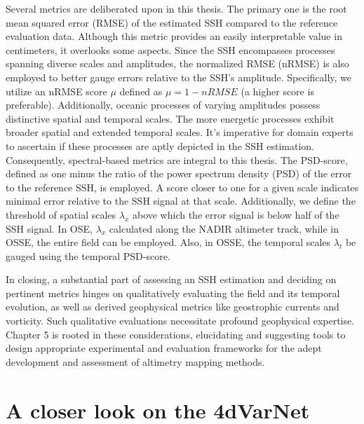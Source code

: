 \begin{bibunit}
Several metrics are deliberated upon in this thesis. The primary one is the root mean squared error (RMSE) of the estimated SSH compared to the reference evaluation data. Although this metric provides an easily interpretable value in centimeters, it overlooks some aspects. Since the SSH encompasses processes spanning diverse scales and amplitudes, the normalized RMSE (nRMSE) is also employed to better gauge errors relative to the SSH's amplitude. Specifically, we utilize an nRMSE score $\mu$ defined as $\mu=1 - nRMSE$ (a higher score is preferable). Additionally, oceanic processes of varying amplitudes possess distinctive spatial and temporal scales. The more energetic processes exhibit broader spatial and extended temporal scales. It's imperative for domain experts to ascertain if these processes are aptly depicted in the SSH estimation. Consequently, spectral-based metrics are integral to this thesis. The PSD-score, defined as one minus the ratio of the power spectrum density (PSD) of the error to the reference SSH, is employed. A score closer to one for a given scale indicates minimal error relative to the SSH signal at that scale. Additionally, we define the threshold of spatial scales $\lambda_x$ above which the error signal is below half of the SSH signal. In OSE, $\lambda_x$ calculated along the NADIR altimeter track, while in OSSE, the entire field can be employed. Also, in OSSE, the temporal scales $\lambda_t$ be gauged using the temporal PSD-score.

In closing, a substantial part of assessing an SSH estimation and deciding on pertinent metrics hinges on qualitatively evaluating the field and its temporal evolution, as well as derived geophysical metrics like geostrophic currents and vorticity. Such qualitative evaluations necessitate profound geophysical expertise. Chapter 5 is rooted in these considerations, elucidating and suggesting tools to design appropriate experimental and evaluation frameworks for the adept development and assessment of altimetry mapping methods.



\section{A closer look on the 4dVarNet}
  \label{c2sec:4dvarnet}


\end{bibunit}
